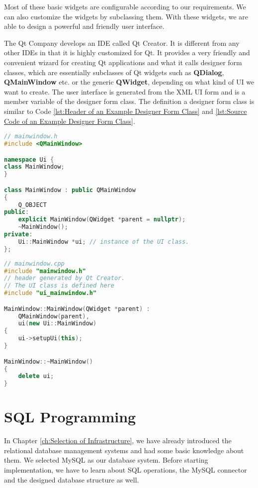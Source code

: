 Most of these basic widgets are configurable according to our requirements. We can also customize the widgets by subclassing them. With these widgets, we are able to design a powerful and friendly user interface.

The Qt Company develops an IDE called Qt Creator. It is different from any other IDEs in that it is highly customized for Qt. It provides a very friendly and convenient wizard for creating Qt applications and what it calls designer form classes, which are essentially subclasses of Qt widgets such as \textbf{QDialog}, \textbf{QMainWindow} etc. or the generic \textbf{QWidget}, depending on what kind of UI we want to create. The user interface is generated from the XML UI form and is a member variable of the designer form class. The definition a designer form class is similar to Code \ref{lst:Header of an Example Designer Form Class} and \ref{lst:Source Code  of an Example Designer Form Class}.

\begin{lstlisting}[language=C++, caption={Header of an Example Designer Form Class\label{lst:Header of an Example Designer Form Class}}]
// mainwindow.h
#include <QMainWindow>

namespace Ui {
class MainWindow;
}

class MainWindow : public QMainWindow
{
    Q_OBJECT
public:
    explicit MainWindow(QWidget *parent = nullptr);
    ~MainWindow();
private:
    Ui::MainWindow *ui; // instance of the UI class.
};
\end{lstlisting}

\begin{lstlisting}[language=C++, caption={Source Code of an Example Designer Form Class\label{lst:Source Code  of an Example Designer Form Class}}]
// mainwindow.cpp  
#include "mainwindow.h"
// header generated by Qt Creator.
// The UI class is defined here
#include "ui_mainwindow.h"  

MainWindow::MainWindow(QWidget *parent) :
    QMainWindow(parent),
    ui(new Ui::MainWindow)
{
    ui->setupUi(this);
}

MainWindow::~MainWindow()
{
    delete ui;
}
\end{lstlisting}

\section{SQL Programming}
In Chapter \ref{ch:Selection of Infrastructure}, we have already introduced the relational database management systems and had some basic knowledge about them. We selected MySQL as our database system. Before starting implementation, we have to learn about SQL operations, the MySQL connector and the designed database structure as well.

